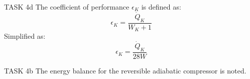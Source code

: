 TASK 4d  
The coefficient of performance \( \epsilon_K \) is defined as:  
\[
\epsilon_K = \frac{\dot{Q}_K}{W_K + 1}
\]  
Simplified as:  
\[
\epsilon_K = \frac{\dot{Q}_K}{28W}
\]  

TASK 4b  
The energy balance for the reversible adiabatic compressor is noted.